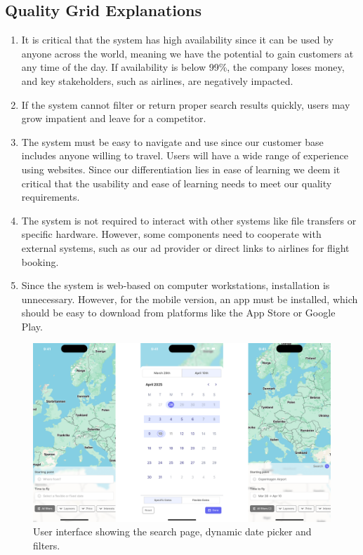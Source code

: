 \subsection*{Quality Grid Explanations}
\begin{enumerate}
    \item It is critical that the system has high availability since it can be used by anyone across the world, meaning we have the potential to gain customers at any time of the day. If availability is below 99\%, the company loses money, and key stakeholders, such as airlines, are negatively impacted.
    \item If the system cannot filter or return proper search results quickly, users may grow impatient and leave for a competitor.
    \item The system must be easy to navigate and use since our customer base includes anyone willing to travel. Users will have a wide range of experience using websites. Since our differentiation lies in ease of learning we deem it critical that the usability and ease of learning needs to meet our quality requirements.
    \item The system is not required to interact with other systems like file transfers or specific hardware. However, some components need to cooperate with external systems, such as our ad provider or direct links to airlines for flight booking.
    \item Since the system is web-based on computer workstations, installation is unnecessary. However, for the mobile version, an app must be installed, which should be easy to download from platforms like the App Store or Google Play.
\end{enumerate}

\newpage
\begin{figure}[h]
    \includegraphics[width=.89\textwidth]{resources/mockup1.png}
    \caption{User interface showing the search page, dynamic date picker and filters.}
    \label{fig:mockup1}
\end{figure}

